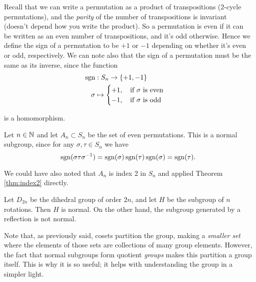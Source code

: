 \begin{example}
  Recall that we can write a permutation as a product of transpositions (2-cycle
  permutations), and the \emph{parity} of the number of transpositions is invariant
  (doesn't depend how you write the product). So a permutation is even if it can be
  written as an even number of transpositions, and it's odd otherwise. Hence we define the
  sign of a permutation to be $+1$ or $-1$ depending on whether it's even or odd,
  respectively. We can note also that the sign of a permutation must be the same as its inverse, since the function
  \begin{align*}
    \operatorname{sgn}&:S_n \to \{+1,-1\} \\
    \sigma &\mapsto
    \begin{cases}
        +1,\quad \text{if } \sigma \text{ is even} \\
        -1, \quad \text{if } \sigma \text{ is odd}
    \end{cases}
  \end{align*}
  
  is a homomorphism.

  Let $n\in\mathbb N$ and let $A_n\subset S_n$ be the set of even permutations. This is a normal
  subgroup, since for any $\sigma, \tau\in S_n$ we have
  \[\operatorname{sgn} (\sigma \tau \sigma^{-1}) =
  \operatorname{sgn}(\sigma)\operatorname{sgn}(\tau)\operatorname{sgn}(\sigma)=\operatorname{sgn}(\tau).\]

  We could have also noted that $A_n$ is index 2 in $S_n$ and applied Theorem \ref{thm:index2} directly.
\end{example}

\begin{example}
  Let $D_{2n}$ be the dihedral group of order $2n$, and let $H$ be the subgroup of $n$
  rotations. Then $H$ is normal. On the other hand, the subgroup generated by a reflection
  is not normal.

\end{example}




\begin{remark}
  Note that, as previously said, cosets partition the group, making a \emph{smaller set}
  where the elements of those sets are collections of many group elements. However, the
  fact that normal subgroups form quotient \emph{groups} makes this partition a group
  itself. This is why it is so useful; it helps with understanding the group in a simpler light.
\end{remark}
